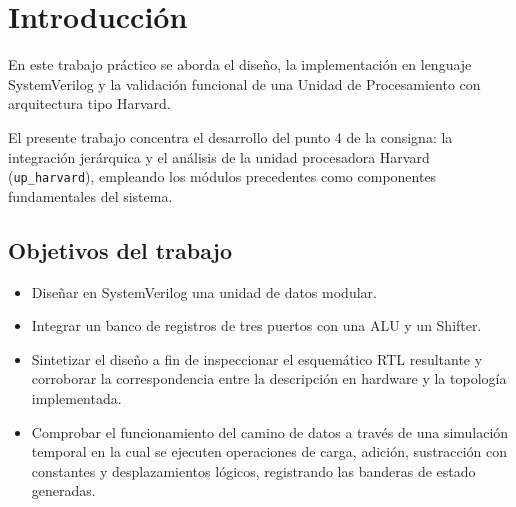 \chapter{Introducción}

En este trabajo práctico se aborda el diseño, la implementación en lenguaje SystemVerilog y la validación
funcional de una Unidad de Procesamiento con arquitectura tipo Harvard.

El presente trabajo concentra el desarrollo del punto 4 de la consigna: la integración jerárquica y el análisis
 de la unidad procesadora Harvard (\texttt{up\_harvard}), empleando los módulos precedentes como componentes
fundamentales del sistema.

\section{Objetivos del trabajo}

\begin{itemize}
  \item Diseñar en SystemVerilog una unidad de datos modular.
  \item Integrar un banco de registros de tres puertos con una ALU y un Shifter. 
  \item Sintetizar el diseño a fin de inspeccionar el esquemático RTL resultante y corroborar la correspondencia entre
    la descripción en hardware y la topología implementada.
  \item Comprobar el funcionamiento del camino de datos a través de una simulación temporal en la cual se ejecuten
    operaciones de carga, adición, sustracción con constantes y desplazamientos lógicos, registrando las banderas de
    estado generadas.
\end{itemize}

